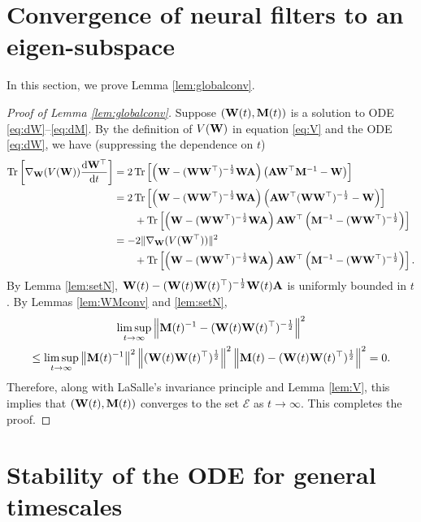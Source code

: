 \documentclass[11pt]{article}
\theoremstyle{definition}
\DeclareMathOperator{\tr}{Tr}
\newcommand{\dd}{\operatorname{d}\!}
\newcommand{\inv}{^{-1}}
\newcommand{\A}{{\bf A}}
\newcommand{\M}{{\bf M}}
\newcommand{\W}{{\bf W}}
\newcommand{\calE}{\mathcal{E}}
\begin{document}
\section{Convergence of neural filters to an eigen-subspace}\label{apdx:gradflow}

In this section, we prove Lemma \ref{lem:globalconv}.

\begin{proof}[Proof of Lemma \ref{lem:globalconv}]
    Suppose $(\W(t),\M(t))$ is a solution to ODE \eqref{eq:dW}--\eqref{eq:dM}.
    By the definition of $V(\W)$ in equation \eqref{eq:V} and the ODE \eqref{eq:dW}, we have
    (suppressing the dependence on $t$)
    \begin{align*}
        \tr\left[\nabla_{\W}(V(\W))\frac{\dd\W^\top}{\dd t}\right]&=2\tr\left[\left(\W-(\W\W^\top)^{-\frac12}\W\A\right)\left(\A\W^\top\M\inv-\W\right)\right] \\
        &=2\tr\left[\left(\W-(\W\W^\top)^{-\frac12}\W\A\right)\left(\A\W^\top(\W\W^\top)^{-\frac12}-\W\right)\right] \\
         &\qquad+\tr\left[\left(\W-(\W\W^\top)^{-\frac12}\W\A\right)\A\W^\top\left(\M\inv-(\W\W^\top)^{-\frac12}\right)\right] \\
        &=-2\|\nabla_{\W}(V(\W^\top))\|^2 \\
         &\qquad+\tr\left[\left(\W-(\W\W^\top)^{-\frac12}\W\A\right)\A\W^\top\left(\M\inv-(\W\W^\top)^{-\frac12}\right)\right].
    \end{align*}
    By Lemma \ref{lem:setN}, $\W(t)-(\W(t)\W(t)^\top)^{-\frac12}\W(t)\A$ is uniformly bounded in $t$.
    By Lemmas \ref{lem:WMconv} and \ref{lem:setN},
    \begin{multline*}
        \limsup_{t\to\infty}\left\|\M(t)\inv-(\W(t)\W(t)^\top)^{-\frac12}\right\|^2 \\\leq\limsup_{t\to\infty}\left\|\M(t)\inv\right\|^2\left\|(\W(t)\W(t)^\top)^\frac12\right\|^2\left\|\M(t)-(\W(t)\W(t)^\top)^{\frac12}\right\|^2=0.
    \end{multline*}
    Therefore, along with LaSalle's invariance principle and Lemma \ref{lem:V}, this implies that $(\W(t),\M(t))$ converges to the set $\calE$ as $t\to\infty$.
    This completes the proof.
\end{proof} 

\section{Stability of the ODE for general timescales}
\label{apdx:tau}
\end{document}
